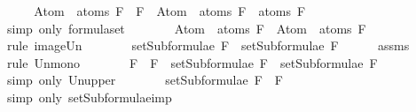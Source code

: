 \begin{isabellebody}
%
\isadelimproof
%
\endisadelimproof
%
\isatagproof
{}\isamarkupfalse%
\ {\isacharminus}\isanewline
\ \ \isamarkupfalse%
\ {\isachardoublequoteopen}Atom\ {\isacharbackquote}\ atoms\ {\isacharparenleft}F{}\ \isactrlbold {\isasymrightarrow}\ F{}{\isacharparenright}\ {\isacharequal}\ Atom\ {\isacharbackquote}\ {\isacharparenleft}atoms\ F{}\ {\isasymunion}\ atoms\ F{}{\isacharparenright}{\isachardoublequoteclose}\isanewline
\ \ \ \ \isamarkupfalse%
\ {\isacharparenleft}simp\ only{\isacharcolon}\ formula{\isachardot}set{\isacharparenleft}{}{\isacharparenright}{\isacharparenright}\isanewline
\ \ \isamarkupfalse%
\ \isamarkupfalse%
\ {\isachardoublequoteopen}{\isasymdots}\ {\isacharequal}\ Atom\ {\isacharbackquote}\ atoms\ F{}\ {\isasymunion}\ Atom\ {\isacharbackquote}\ atoms\ F{}{\isachardoublequoteclose}\ \isanewline
\ \ \ \ \isamarkupfalse%
\ {\isacharparenleft}rule\ image{\isacharunderscore}Un{\isacharparenright}\isanewline
\ \ \isamarkupfalse%
\ \isamarkupfalse%
\ {\isachardoublequoteopen}{\isasymdots}\ {\isasymsubseteq}\ setSubformulae\ F{}\ {\isasymunion}\ setSubformulae\ F{}{\isachardoublequoteclose}\isanewline
\ \ \ \ \isamarkupfalse%
\ assms\isanewline
\ \ \ \ \isamarkupfalse%
\ {\isacharparenleft}rule\ Un{\isacharunderscore}mono{\isacharparenright}\isanewline
\ \ \isamarkupfalse%
\ \isamarkupfalse%
\ {\isachardoublequoteopen}{\isasymdots}\ {\isasymsubseteq}\ {\isacharbraceleft}F{}\ \isactrlbold {\isasymrightarrow}\ F{}{\isacharbraceright}\ {\isasymunion}\ {\isacharparenleft}setSubformulae\ F{}\ {\isasymunion}\ setSubformulae\ F{}{\isacharparenright}{\isachardoublequoteclose}\isanewline
\ \ \ \ \isamarkupfalse%
\ {\isacharparenleft}simp\ only{\isacharcolon}\ Un{\isacharunderscore}upper{}{\isacharparenright}\isanewline
\ \ \isamarkupfalse%
\ \isamarkupfalse%
\ {\isachardoublequoteopen}{\isasymdots}\ {\isacharequal}\ setSubformulae\ {\isacharparenleft}F{}\ \isactrlbold {\isasymrightarrow}\ F{}{\isacharparenright}{\isachardoublequoteclose}\isanewline
\ \ \ \ \isamarkupfalse%
\ {\isacharparenleft}simp\ only{\isacharcolon}\ setSubformulae{\isacharunderscore}imp{\isacharparenright}\isanewline
\ \ \isamarkupfalse%

\end{isabellebody}

